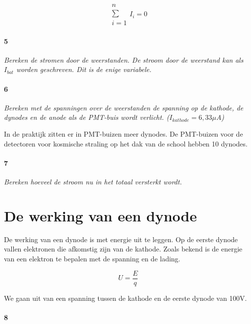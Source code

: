 \begin{equation}
\begin{array}{c} 
n\\ 
\sum\\ 
i=1
\end{array}
I_{i}=0
\end{equation}

\paragraph{5}

\textit{Bereken de stromen door de weerstanden. De stroom door de weerstand 
kan als $I_{bat}$ worden geschreven. Dit is de enige variabele.}

\paragraph{6}

\textit{Bereken met de spanningen over de weerstanden de spanning op de kathode, de dynodes en de anode
als de PMT-buis wordt verlicht. ($I_{kathode}=6,33 \mu$A)}

In de praktijk zitten er in PMT-buizen meer dynodes. De PMT-buizen
voor de detectoren voor kosmische straling op het dak van de school
hebben 10 dynodes.


\paragraph{7}

\textit{Bereken hoeveel de stroom nu in het totaal versterkt wordt.}


\section{De werking van een dynode}

De werking van een dynode is met energie uit te leggen. Op de eerste
dynode vallen elektronen die afkomstig zijn van de kathode. Zoals
bekend is de energie van een elektron te bepalen met de spanning en
de lading.

\begin{equation}
U=\frac{E}{q}
\end{equation}


We gaan uit van een spanning tussen de kathode en de eerste dynode van 100V.


\paragraph{8}

